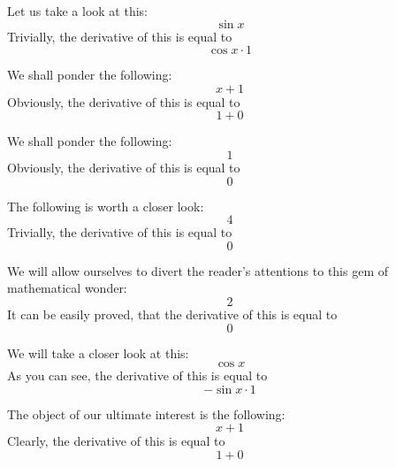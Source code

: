 \documentclass{article}
\begin{document}
Let us take a look at this:
\begin{equation}
\sin x 
\end{equation}
Trivially, the derivative of this is equal to
\begin{equation}
\cos x \cdot 1 
\end{equation}

We shall ponder the following:
\begin{equation}
x + 1 
\end{equation}
Obviously, the derivative of this is equal to
\begin{equation}
1 + 0 
\end{equation}

We shall ponder the following:
\begin{equation}
1 
\end{equation}
Obviously, the derivative of this is equal to
\begin{equation}
0 
\end{equation}

The following is worth a closer look:
\begin{equation}
4 
\end{equation}
Trivially, the derivative of this is equal to
\begin{equation}
0 
\end{equation}

We will allow ourselves to divert the reader's attentions to this gem of mathematical wonder:
\begin{equation}
2 
\end{equation}
It can be easily proved, that the derivative of this is equal to
\begin{equation}
0 
\end{equation}

We will take a closer look at this:
\begin{equation}
\cos x 
\end{equation}
As you can see, the derivative of this is equal to
\begin{equation}
-\sin x \cdot 1 
\end{equation}

The object of our ultimate interest is the following:
\begin{equation}
x + 1 
\end{equation}
Clearly, the derivative of this is equal to
\begin{equation}
1 + 0 
\end{equation}
\end{document}
